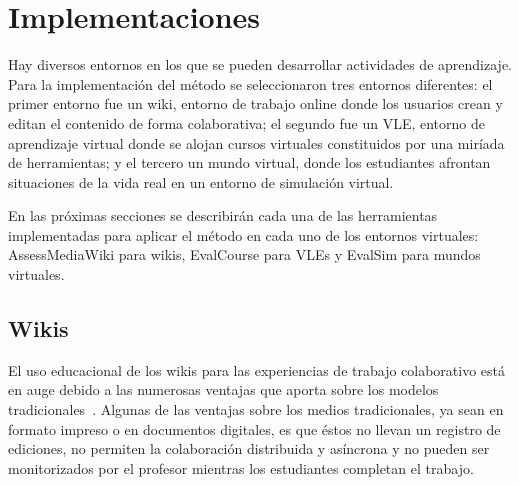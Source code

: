 


\section{Implementaciones}
\label{sec:tools}

Hay diversos entornos en los que se pueden desarrollar actividades de aprendizaje. Para la implementación del método se seleccionaron tres entornos diferentes: el primer entorno fue un wiki, entorno de trabajo online donde los usuarios crean y editan el contenido de forma colaborativa; el segundo fue un VLE, entorno de aprendizaje virtual donde se alojan cursos virtuales constituidos por una miríada de herramientas; y el tercero un mundo virtual, donde los estudiantes afrontan situaciones de la vida real en un entorno de simulación virtual.

En las próximas secciones se describirán cada una de las herramientas implementadas para aplicar el método en cada uno de los entornos virtuales: AssessMediaWiki para wikis, EvalCourse para VLEs y EvalSim para mundos virtuales.

\subsection{Wikis}

El uso educacional de los wikis para las experiencias de trabajo colaborativo está en auge debido a las numerosas ventajas que aporta sobre los modelos tradicionales~\cite{elgort2008wiki}. Algunas de las ventajas sobre los medios tradicionales, ya sean en formato impreso o en documentos digitales, es que éstos no llevan un registro de ediciones, no permiten la colaboración distribuida y asíncrona y no pueden ser monitorizados por el profesor mientras los estudiantes completan el trabajo.

